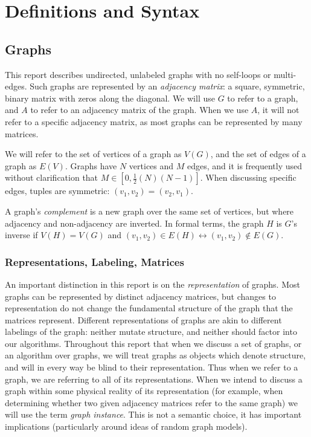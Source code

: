 \documentclass[11pt,a4paper]{report}
\begin{document}
\chapter{Definitions and Syntax}


\section{Graphs}
This report describes undirected, unlabeled graphs with no self-loops or multi-edges.
Such graphs are represented by an \emph{adjacency matrix}: a square, symmetric, binary matrix with zeros along the diagonal.
We will use $G$ to refer to a graph, and $A$ to refer to an adjacency matrix of the graph.
When we use $A$, it will not refer to a specific adjacency matrix, as most graphs can be represented by many matrices.

We will refer to the set of vertices of a graph as $V(G)$, and the set of edges of a graph as $E(V)$.
Graphs have $N$ vertices and $M$ edges, and it is frequently used without clarification that $M \in [0, \frac{1}{2}(N)(N-1)]$.
When discussing specific edges, tuples are symmetric: $(v_1, v_2) = (v_2, v_1)$.

A graph's \emph{complement} is a new graph over the same set of vertices, but where adjacency and non-adjacency are inverted.
In formal terms, the graph $H$ is $G$'s inverse if $V(H) = V(G)$ and $(v_1, v_2) \in E(H) \leftrightarrow (v_1, v_2) \notin E(G)$.

\subsection{Representations, Labeling, Matrices}
An important distinction in this report is on the \emph{representation} of graphs.
Most graphs can be represented by distinct adjacency matrices, but changes to representation do not change the fundamental structure of the graph that the matrices represent.
Different representations of graphs are akin to different labelings of the graph: neither mutate structure, and neither should factor into our algorithms.
Throughout this report that when we discuss a set of graphs, or an algorithm over graphs, we will treat graphs as objects which denote structure, and will in every way be blind to their representation.
Thus when we refer to a graph, we are referring to all of its representations.
When we intend to discuss a graph within some physical reality of its representation (for example, when determining whether two given adjacency matrices refer to the same graph) we will use the term \emph{graph instance}.
This is not a semantic choice, it has important implications (particularly around ideas of random graph models).
\end{document}
